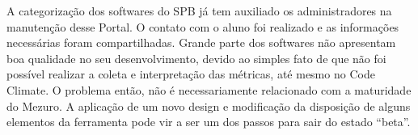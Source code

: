 A categorização dos softwares do SPB já tem auxiliado os administradores na
manutenção desse Portal. O contato com o aluno foi realizado e as informações
necessárias foram compartilhadas. Grande parte dos softwares não apresentam boa
qualidade no seu desenvolvimento, devido ao simples fato de que não foi possível
realizar a coleta e interpretação das métricas, até mesmo no Code Climate. O
problema então, não é necessariamente relacionado com a maturidade do Mezuro.
A aplicação de um novo design e modificação da disposição de alguns elementos
da ferramenta pode vir a ser um dos passos para sair do estado ``beta''.
